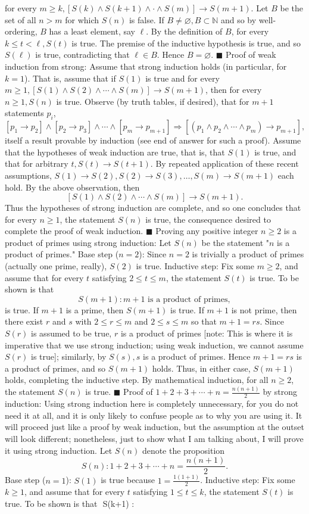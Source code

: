\documentclass{article}
\begin{document}
for every $m\geq k, [S(k)\land S(k+1)\land\cdot\land S(m)]\to S(m+1)$. Let $B$ be the set of all $n>m$ for which $S(n)$ is false. If $B\neq\varnothing, B\subset\mathbb{N}$ and so by well-ordering, $B$ has a least element, say $\ell$. By the definition of $B$, for every $k\leq t<\ell, S(t)$ is true. The premise of the inductive hypothesis is true, and so $S(\ell)$ is true, contradicting that $\ell\in B$. Hence $B=\varnothing$. $\blacksquare$ Proof of weak induction from strong: Assume that strong induction holds (in particular, for $k=1$). That is, assume that if $S(1)$ is true and for every $m\geq 1, [S(1)\land S(2)\land\cdots\land S(m)]\to S(m+1)$, then for every $n\geq 1, S(n)$ is true. Observe (by truth tables, if desired), that for $m+1$ statements $p_i$, $$ [p_1\to p_2]\land[p_2\to p_3]\land\cdots\land[p_m\to p_{m+1}]\Rightarrow[(p_1\land p_2\land\cdots\land p_m)\to p_{m+1}],\tag{$\dagger$} $$ itself a result provable by induction (see end of answer for such a proof). Assume that the hypotheses of weak induction are true, that is, that $S(1)$ is true, and that for arbitrary $t, S(t)\to S(t+1)$. By repeated application of these recent assumptions, $S(1)\to S(2), S(2)\to S(3),\ldots, S(m)\to S(m+1)$ each hold. By the above observation, then $$ [S(1)\land S(2)\land\cdots\land S(m)]\to S(m+1). $$ Thus the hypotheses of strong induction are complete, and so one concludes that for every $n\geq 1$, the statement $S(n)$ is true, the consequence desired to complete the proof of weak induction. $\blacksquare$ Proving any positive integer $n\geq 2$ is a product of primes using strong induction: Let $S(n)$ be the statement "$n$ is a product of primes." Base step ($n=2$): Since $n=2$ is trivially a product of primes (actually one prime, really), $S(2)$ is true. Inductive step: Fix some $m\geq 2$, and assume that for every $t$ satisfying $2\leq t\leq m$, the statement $S(t)$ is true. To be shown is that $$ S(m+1) : m+1 \text{ is a product of primes}, $$ is true. If $m+1$ is a prime, then $S(m+1)$ is true. If $m+1$ is not prime, then there exist $r$ and $s$ with $2\leq r\leq m$ and $2\leq s\leq m$ so that $m+1=rs$. Since $S(r)$ is assumed to be true, $r$ is a product of primes [note: This is where it is imperative that we use strong induction; using weak induction, we cannot assume $S(r)$ is true]; similarly, by $S(s), s$ is a product of primes. Hence $m+1=rs$ is a product of primes, and so $S(m+1)$ holds. Thus, in either case, $S(m+1)$ holds, completing the inductive step. By mathematical induction, for all $n\geq 2$, the statement $S(n)$ is true. $\blacksquare$ Proof of $1+2+3+\cdots+n = \frac{n(n+1)}{2}$ by strong induction: Using strong induction here is completely unnecessary, for you do not need it at all, and it is only likely to confuse people as to why you are using it. It will proceed just like a proof by weak induction, but the assumption at the outset will look different; nonetheless, just to show what I am talking about, I will prove it using strong induction. Let $S(n)$ denote the proposition $$ S(n) : 1+2+3+\cdots+n = \frac{n(n+1)}{2}. $$ Base step ($n=1$): $S(1)$ is true because $1=\frac{1(1+1)}{2}$. Inductive step: Fix some $k\geq 1$, and assume that for every $t$ satisfying $1\leq t\leq k$, the statement $S(t)$ is true. To be shown is that $$ S(k+1) : 
\end{document}
